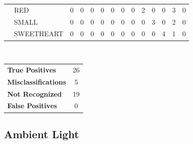 \documentclass[12pt]{article}
\begin{document}
\begin{table}[h]
\begin{tabular}{ll|c|c|c|c|c|c|c|c|c|c|c|c|}
\multicolumn{1}{|l}{}          & \multicolumn{1}{|l|}{RED}        & 0   & 0   & 0         & 0     & 0    & 0      & 0     & 2   & 0     & 0          & 3              & 0              \\ \cline{2-14} 
\multicolumn{1}{|l}{}          & \multicolumn{1}{|l|}{SMALL}      & 0   & 0   & 0         & 0     & 0    & 0      & 0     & 0   & 3     & 0          & 2              & 0              \\ \cline{2-14} 
\multicolumn{1}{|l}{}          & \multicolumn{1}{|l|}{SWEETHEART} & 0   & 0   & 0         & 0     & 0    & 0      & 0     & 0   & 0     & 4          & 1              & 0              \\ \hline
\end{tabular}
\\
\begin{tabular}{l c}

\textbf{True Positives} & 26 \\
\textbf{Misclassifications} & 5 \\
\textbf{Not Recognized} & 19 \\
\textbf{False Positives} & 0 \\

\end{tabular}
\end{table}

\newpage
\subsection*{Ambient Light}
\end{document}
